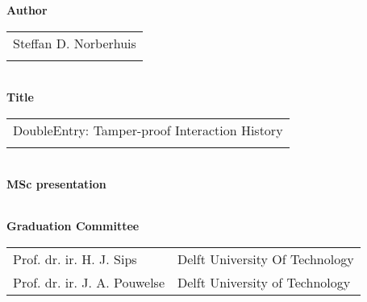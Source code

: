\thispagestyle{empty}

\noindent \textbf{Author}\\
\begin{tabular}{l}
Steffan D. Norberhuis\\
\\
\end{tabular}\\
\noindent \textbf{Title}\\
\begin{tabular}{l}
DoubleEntry: Tamper-proof Interaction History\\
\\
\end{tabular}\\
\noindent \textbf{MSc presentation}\\
\begin{tabular}{l}
\\
\end{tabular}

\vspace{1.1cm}

\noindent \textbf{Graduation Committee}\\
\begin{tabular}{ll}
Prof. dr. ir. H. J. Sips            & Delft University Of Technology \\
Prof. dr. ir. J. A. Pouwelse        & Delft University of Technology \\
\end{tabular}

\begin{abstract} %
\end{abstract}

\clearpage

